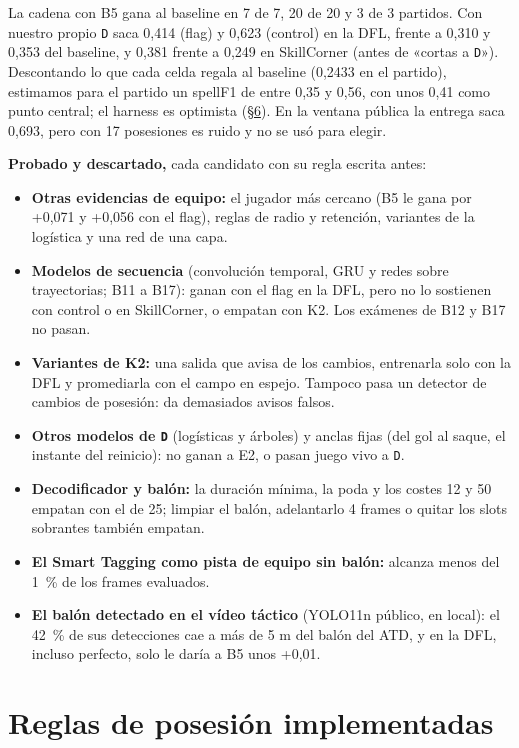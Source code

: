 \documentclass[10pt,a4paper]{article}
\newcommand{\code}[1]{\texttt{\textcolor{codigo}{#1}}}
\begin{document}
La cadena con B5 gana al baseline en 7 de 7, 20 de 20 y 3 de 3 partidos. Con nuestro propio \code{D} saca 0,414 (flag) y 0,623 (control) en la DFL, frente a 0,310 y 0,353 del baseline, y 0,381 frente a 0,249 en SkillCorner (antes de «cortas a \code{D}»). Descontando lo que cada celda regala al baseline (0,2433 en el partido), estimamos para el partido un spellF1 de entre 0,35 y 0,56, con unos 0,41 como punto central; el harness es optimista (\hyperref[sec:6]{\S6}). En la ventana pública la entrega saca 0,693, pero con 17 posesiones es ruido y no se usó para elegir.

\textbf{Probado y descartado,} cada candidato con su regla escrita antes:

\begin{itemize}
  \item \textbf{Otras evidencias de equipo:} el jugador más cercano (B5 le gana por +0,071 y +0,056 con el flag), reglas de radio y retención, variantes de la logística y una red de una capa.
  \item \textbf{Modelos de secuencia} (convolución temporal, GRU y redes sobre trayectorias; B11 a B17): ganan con el flag en la DFL, pero no lo sostienen con control o en SkillCorner, o empatan con K2. Los exámenes de B12 y B17 no pasan.
  \item \textbf{Variantes de K2:} una salida que avisa de los cambios, entrenarla solo con la DFL y promediarla con el campo en espejo. Tampoco pasa un detector de cambios de posesión: da demasiados avisos falsos.
  \item \textbf{Otros modelos de \code{D}} (logísticas y árboles) y anclas fijas (del gol al saque, el instante del reinicio): no ganan a E2, o pasan juego vivo a \code{D}.
  \item \textbf{Decodificador y balón:} la duración mínima, la poda y los costes 12 y 50 empatan con el de 25; limpiar el balón, adelantarlo 4 frames o quitar los slots sobrantes también empatan.
  \item \textbf{El Smart Tagging como pista de equipo sin balón:} alcanza menos del 1~\% de los frames evaluados.
  \item \textbf{El balón detectado en el vídeo táctico} (YOLO11n público, en local): el 42~\% de sus detecciones cae a más de 5 m del balón del ATD, y en la DFL, incluso perfecto, solo le daría a B5 unos +0,01.
\end{itemize}

\section{Reglas de posesión implementadas}\label{sec:3}
\end{document}
